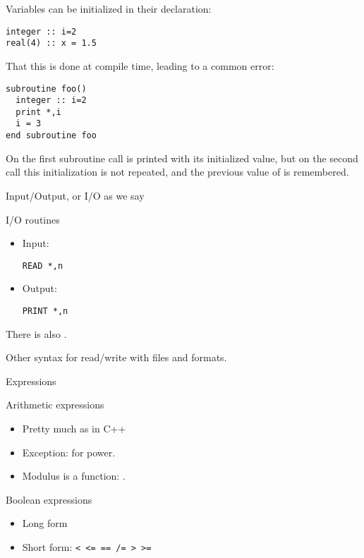 Variables can be initialized in their declaration:
\begin{verbatim}
integer :: i=2
real(4) :: x = 1.5
\end{verbatim}

That this is done at compile time, leading to a common error:
\begin{verbatim}
subroutine foo()
  integer :: i=2
  print *,i
  i = 3
end subroutine foo
\end{verbatim}
On the first subroutine call  is printed with its initialized
value, but on the second call this initialization is not repeated, and
the previous value of  is remembered.

 {Input/Output, or I/O as we say}
\label{sec:fio}

\begin{block}{I/O routines}
  \label{sl:frw}
  \begin{itemize}
  \item Input: 
\begin{verbatim}
READ *,n
\end{verbatim}
\item Output:
\begin{verbatim}
PRINT *,n
\end{verbatim}
  \end{itemize}
  There is also .

  Other syntax for read/write with files and formats.
\end{block}

 {Expressions}
\label{sec:fexpr}

\begin{block}{Arithmetic expressions}
  \label{sl:farith}
  \begin{itemize}
  \item Pretty much as in C++
  \item Exception:  for power.
  \item Modulus is a function: .
  \end{itemize}
\end{block}

\begin{block}{Boolean expressions}
  \label{sl:fbool}
  \begin{itemize}
  \item 
    Long form
  \item Short form:
    \verb+< <= == /= > >=+
  \end{itemize}
\end{block}

